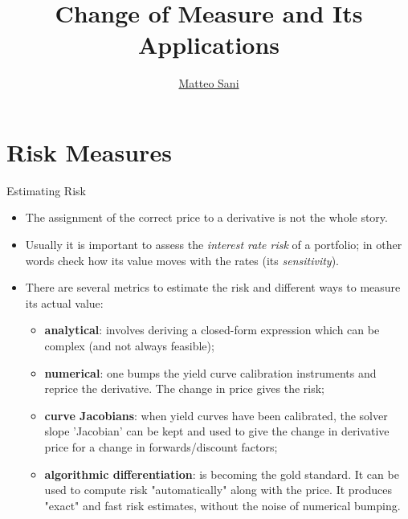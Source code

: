 \documentclass{beamer}
\title{Change of Measure and Its Applications}
\author{\href{mailto:matteo.sani@unisi.it}{Matteo Sani}}
\begin{document}
	\begin{frame}[plain]
		\maketitle
	\end{frame}

	\section{Risk Measures}
	\begin{frame}{Estimating Risk}
		\begin{itemize}
			\item The assignment of the correct price to a derivative is not the whole story.
			\item Usually it is important to assess the \emph{interest rate risk} of a portfolio; in other words check how its value moves with the rates (its \emph{sensitivity}).
			\item There are several metrics to estimate the risk and different ways to measure its actual value:
			\begin{itemize}
				\item \textbf{analytical}: involves deriving a closed-form expression which can be complex (and not always feasible);
				\item \textbf{numerical}: one bumps the yield curve calibration instruments and reprice the derivative. The change in price gives the risk;
				\item \textbf{curve Jacobians}: when yield curves have been calibrated, the solver slope 'Jacobian' can be kept and used to give the change in derivative price for a change in forwards/discount factors;
				\item \textbf{algorithmic differentiation}: is becoming the gold standard. It can be used to compute risk "automatically" along with the price. It produces "exact" and fast risk estimates, without the noise of numerical bumping.
			\end{itemize}

		\end{itemize}
	\end{frame}
\end{document}
